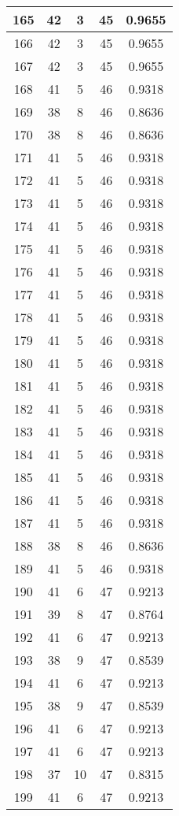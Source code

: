 \documentclass[letterpaper, 12pt]{article}
\begin{document}
\begin{longtable}{|c|c|c|c|c|}
\hline
165 & 42 & 3 & 45 & 0.9655 \\
\hline
166 & 42 & 3 & 45 & 0.9655 \\
\hline
167 & 42 & 3 & 45 & 0.9655 \\
\hline
168 & 41 & 5 & 46 & 0.9318 \\
\hline
169 & 38 & 8 & 46 & 0.8636 \\
\hline
170 & 38 & 8 & 46 & 0.8636 \\
\hline
171 & 41 & 5 & 46 & 0.9318 \\
\hline
172 & 41 & 5 & 46 & 0.9318 \\
\hline
173 & 41 & 5 & 46 & 0.9318 \\
\hline
174 & 41 & 5 & 46 & 0.9318 \\
\hline
175 & 41 & 5 & 46 & 0.9318 \\
\hline
176 & 41 & 5 & 46 & 0.9318 \\
\hline
177 & 41 & 5 & 46 & 0.9318 \\
\hline
178 & 41 & 5 & 46 & 0.9318 \\
\hline
179 & 41 & 5 & 46 & 0.9318 \\
\hline
180 & 41 & 5 & 46 & 0.9318 \\
\hline
181 & 41 & 5 & 46 & 0.9318 \\
\hline
182 & 41 & 5 & 46 & 0.9318 \\
\hline
183 & 41 & 5 & 46 & 0.9318 \\
\hline
184 & 41 & 5 & 46 & 0.9318 \\
\hline
185 & 41 & 5 & 46 & 0.9318 \\
\hline
186 & 41 & 5 & 46 & 0.9318 \\
\hline
187 & 41 & 5 & 46 & 0.9318 \\
\hline
188 & 38 & 8 & 46 & 0.8636 \\
\hline
189 & 41 & 5 & 46 & 0.9318 \\
\hline
190 & 41 & 6 & 47 & 0.9213 \\
\hline
191 & 39 & 8 & 47 & 0.8764 \\
\hline
192 & 41 & 6 & 47 & 0.9213 \\
\hline
193 & 38 & 9 & 47 & 0.8539 \\
\hline
194 & 41 & 6 & 47 & 0.9213 \\
\hline
195 & 38 & 9 & 47 & 0.8539 \\
\hline
196 & 41 & 6 & 47 & 0.9213 \\
\hline
197 & 41 & 6 & 47 & 0.9213 \\
\hline
198 & 37 & 10 & 47 & 0.8315 \\
\hline
199 & 41 & 6 & 47 & 0.9213 \\
\hline
\end{longtable}
\end{document}
